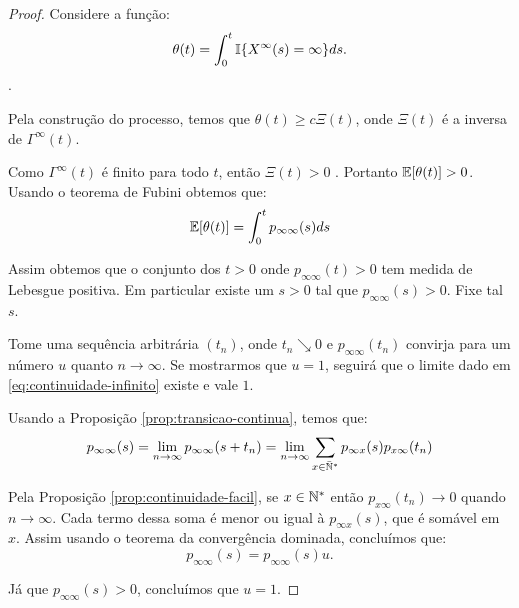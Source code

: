 \begin{proof}
  Considere a função:
  \begin{displaymath}
    \theta(t) = \int_0^t {\mathbb{I}} \{ X^\infty (s) = \infty \} ds.
  \end{displaymath}.
  
  Pela construção do processo, temos que $\theta(t) \geq c
  \Xi(t)$, onde $\Xi(t)$ é a inversa de $\Gamma^\infty(t)$.

  Como $\Gamma^\infty(t)$ é \qc finito para todo $t$, então $\Xi(t) >
  0$ \qc. Portanto ${\mathbb{E}} [\theta(t)] > 0$. Usando o teorema de Fubini
  obtemos que:
  \begin{displaymath}
    {\mathbb{E}}[\theta(t)] =  \int_0^t p_{\infty \infty} (s) ds
  \end{displaymath}

  Assim obtemos que o conjunto dos $t > 0$ onde $p_{\infty \infty}(t)
  > 0$ tem medida de Lebesgue positiva. Em particular existe um $s >
  0$ tal que $p_{\infty \infty}(s) > 0$. Fixe tal $s$.

  Tome uma sequência arbitrária $(t_n)$, onde $t_n \searrow 0$ e
  $p_{\infty \infty} (t_n)$ convirja para um número $u$ quanto $n \to
  \infty$.  Se mostrarmos que $u = 1$, seguirá que o limite dado em
  \eqref{eq:continuidade-infinito} existe e vale $1$.


  Usando a Proposição \ref{prop:transicao-continua}, temos que:
  \begin{displaymath}
    p_{\infty\infty}(s) = \lim_{n \to \infty} p_{\infty \infty}(s+t_n) = \lim_{n \to
      \infty} \sum_{x \in {\mathbb{\bar{N}^*}}} p_{\infty x}(s) p_{x \infty} (t_n)
  \end{displaymath}

  Pela Proposição \ref{prop:continuidade-facil}, se $x \in {\mathbb{N^*}}$ então
  $p_{x \infty}(t_n) \to 0$ quando $n \to \infty$. Cada termo
  dessa soma é menor ou igual à $p_{\infty x} (s)$, que é somável em
  $x$. Assim usando o teorema da convergência dominada, concluímos
  que:
  \begin{displaymath}
    p_{\infty\infty}(s) = p_{\infty \infty}(s)u.
  \end{displaymath}

  Já que $p_{\infty \infty}(s) > 0$, concluímos que $u = 1$.
\end{proof}

